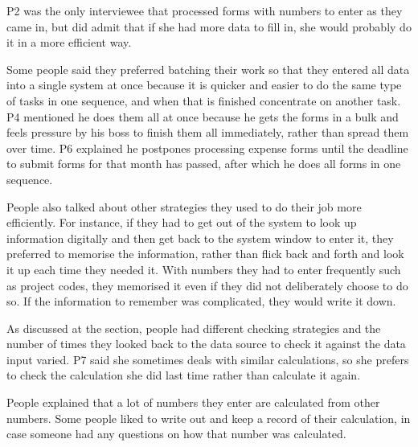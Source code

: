 \documentclass[11pt,oneside]{report}
\begin{document}
P2 was the only interviewee that processed forms with numbers to enter as they came in, but did admit that if she had more data to fill in, she would probably do it in a more efficient way.

Some people said they preferred batching their work so that they entered all data into a single system at once because it is quicker and easier to do the same type of tasks in one sequence, and when that is finished concentrate on another task. P4 mentioned he does them all at once because he gets the forms in a bulk and feels pressure by his boss to finish them all immediately, rather than spread them over time. P6 explained he postpones processing expense forms until the deadline to submit forms for that month has passed, after which he does all forms in one sequence. 

People also talked about other strategies they used to do their job more efficiently. For instance, if they had to get out of the system to look up information digitally and then get back to the system window to enter it, they preferred to memorise the information, rather than flick back and forth and look it up each time they needed it. With numbers they had to enter frequently such as project codes, they memorised it even if they did not deliberately choose to do so. If the information to remember was complicated, they would write it down.

As discussed at the  section, people had different checking strategies and the number of times they looked back to the data source to check it against the data input varied. P7 said she sometimes deals with similar calculations, so she prefers to check the calculation she did last time rather than calculate it again. 

People explained that a lot of numbers they enter are calculated from other numbers. Some people liked to write out and keep a record of their calculation, in case someone had any questions on how that number was calculated.
\end{document}
